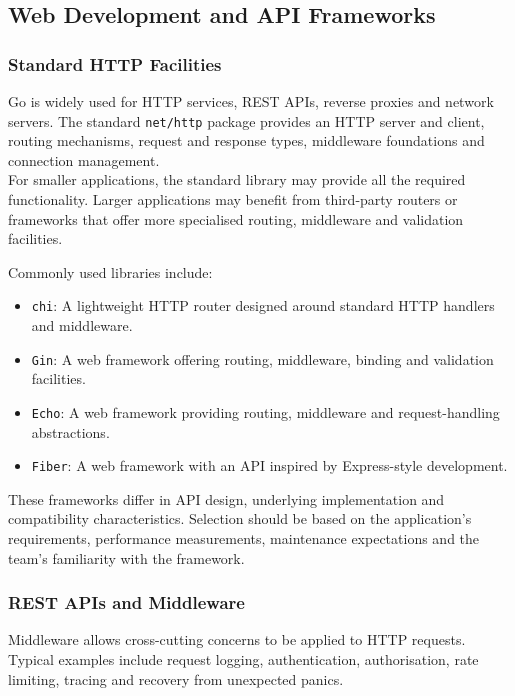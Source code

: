 \subsection{Web Development and API Frameworks}

\subsubsection{Standard HTTP Facilities}

Go is widely used for HTTP services, REST APIs, reverse proxies and network servers. The standard \texttt{net/http} package provides an HTTP server and client, routing mechanisms, request and response types, middleware foundations and connection management.\\

For smaller applications, the standard library may provide all the required functionality. Larger applications may benefit from third-party routers or frameworks that offer more specialised routing, middleware and validation facilities.

Commonly used libraries include:

\begin{itemize}
    \item \texttt{chi}: A lightweight HTTP router designed around standard HTTP handlers and middleware.
    \item \texttt{Gin}: A web framework offering routing, middleware, binding and validation facilities.
    \item \texttt{Echo}: A web framework providing routing, middleware and request-handling abstractions.
    \item \texttt{Fiber}: A web framework with an API inspired by Express-style development.
\end{itemize}

These frameworks differ in API design, underlying implementation and compatibility characteristics. Selection should be based on the application's requirements, performance measurements, maintenance expectations and the team's familiarity with the framework.

\subsubsection{REST APIs and Middleware}

Middleware allows cross-cutting concerns to be applied to HTTP requests. Typical examples include request logging, authentication, authorisation, rate limiting, tracing and recovery from unexpected panics.\\

